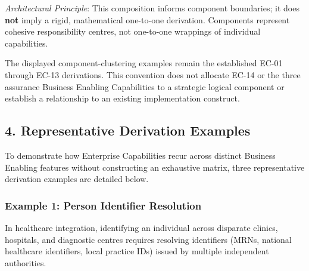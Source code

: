 \emph{Architectural Principle}: This composition informs component boundaries; it does \textbf{not} imply a rigid, mathematical one-to-one derivation. Components represent cohesive responsibility centres, not one-to-one wrappings of individual capabilities.

\label{rad:tier-model:184}

The displayed component-clustering examples remain the established EC-01 through EC-13 derivations. This convention does not allocate EC-14 or the three assurance Business Enabling Capabilities to a strategic logical component or establish a relationship to an existing implementation construct.

\label{rad:tier-model:186}

\par\smallskip
{}\label{rad:tier-model:188}
\subsection*{4. Representative Derivation Examples}
\label{rad:tier-model:190}

To demonstrate how Enterprise Capabilities recur across distinct Business Enabling features without constructing an exhaustive matrix, three representative derivation examples are detailed below.

\label{rad:tier-model:192}
\subsubsection*{Example 1: Person Identifier Resolution}
\label{rad:tier-model:194}

In healthcare integration, identifying an individual across disparate clinics, hospitals, and diagnostic centres requires resolving identifiers (MRNs, national healthcare identifiers, local practice IDs) issued by multiple independent authorities.

\label{rad:tier-model:196}

